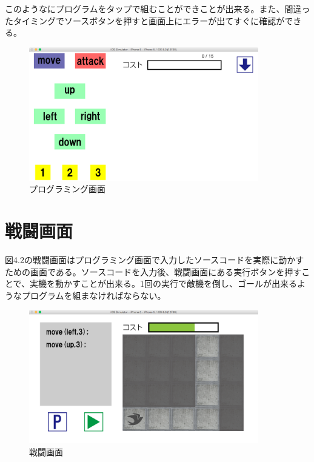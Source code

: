 \documentclass[openany,11pt,papersize]{jsbook}
\begin{document}
このようなにプログラムをタップで組むことができことが出来る。また、間違ったタイミングでソースボタンを押すと画面上にエラーが出てすぐに確認ができる。

\begin{figure}[H]
\begin{center}
\includegraphics[width=10cm, bb=0 0 1136 662]{img/Prog-ra_programming.png}
\end{center}
\caption{プログラミング画面}
\end{figure}


\section{戦闘画面}
図4.2の戦闘画面はプログラミング画面で入力したソースコードを実際に動かすための画面である。ソースコードを入力後、戦闘画面にある実行ボタンを押すことで、実機を動かすことが出来る。1回の実行で敵機を倒し、ゴールが出来るようなプログラムを組まなければならない。

\begin{figure}[h]
\begin{center}
\includegraphics[width=10cm, bb=0 0 1136 662]{img/Prog-ra_Battle.png}
\end{center}
\caption{戦闘画面}
\end{figure}
\end{document}
